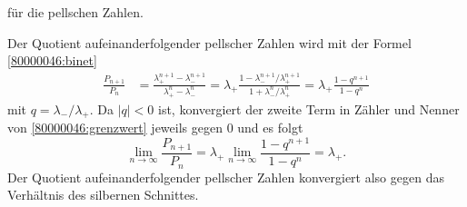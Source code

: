 \begin{loesung}
\begin{teilaufgaben}
\begin{equation}
\end{equation}
für die pellschen Zahlen.
\item
Der Quotient aufeinanderfolgender pellscher Zahlen wird mit der Formel
\eqref{80000046:binet}
\begin{align}
\frac{P_{n+1}}{P_n}
&=
\frac{\lambda_+^{n+1}-\lambda_-^{n+1}}{\lambda_+^n-\lambda_-^n}
=
\lambda_+
\frac{1 - \lambda_-^{n+1}/\lambda_+^{n+1}}{1+\lambda_-^n/\lambda_+^n}
=
\lambda_+
\frac{1-q^{n+1}}{1-q^{n}}
\label{80000046:grenzwert}
\end{align}
mit $q=\lambda_-/\lambda_+$.
Da $|q|<0$ ist, konvergiert der zweite Term in Zähler und Nenner von
\eqref{80000046:grenzwert} jeweils gegen $0$ und es folgt
\[
\lim_{n\to\infty}
\frac{P_{n+1}}{P_n}
=
\lambda_+
\lim_{n\to\infty}
\frac{1-q^{n+1}}{1-q^{n}}
=
\lambda_+.
\]
Der Quotient aufeinanderfolgender pellscher Zahlen konvergiert also
gegen das Verhältnis des silbernen Schnittes.
\qedhere
\end{teilaufgaben}
\end{loesung}


